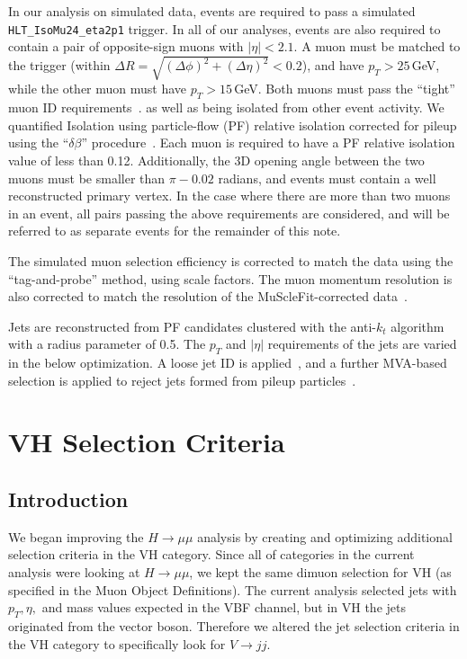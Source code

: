 \documentclass[12pt]{article}
\begin{document}
In our analysis on simulated data, events are required to pass a simulated \texttt{HLT\_IsoMu24\_eta2p1} trigger.
In all of our analyses, events are also required to contain a pair of opposite-sign muons with $|\eta|<2.1$.
A muon must be matched to the trigger (within $\Delta R = \sqrt{(\Delta \phi)^2+(\Delta \eta)^2}< 0.2$), 
and have $p_T>25$\,GeV, while the other muon must have $p_T>15$\,GeV.
Both muons must pass the ``tight'' muon ID requirements~\cite{AN2012_459}.
as well as being isolated from other event activity.  We quantified Isolation using
particle-flow (PF) relative isolation corrected for pileup using the ``$\delta \beta$''
procedure~\cite{AN2012_459}.  Each muon is required to have a PF relative isolation value
of less than 0.12.  Additionally, the 3D opening angle between the two muons must be
smaller than $\pi-0.02$ radians, and events must contain a well reconstructed primary
vertex.
In the case where there are more than two muons in an event, all pairs passing the above
requirements are considered, and will be referred to as separate events for the remainder
of this note.  

The simulated muon selection efficiency is corrected to match the data using 
the ``tag-and-probe'' method, using scale factors.  The muon momentum resolution
is also corrected to match the resolution of the MuScleFit-corrected data~\cite{AN2012_459}.

Jets are reconstructed from PF candidates clustered with the anti-$k_t$ algorithm with
a radius parameter of 0.5.  The $p_T$ and $|\eta|$ requirements of the jets are varied in
the below optimization.  A loose jet ID is applied~\cite{AN2012_459}, and a further
MVA-based selection is applied to reject jets formed from pileup particles~\cite{PUID}.

\section{VH Selection Criteria}

\subsection{Introduction}

We began improving the $H \rightarrow \mu \mu$ analysis by creating and optimizing additional selection criteria in the VH category. 
Since all of categories in the current analysis were looking at $H \rightarrow \mu \mu$, we kept the same dimuon 
selection for VH (as specified in the Muon Object Definitions). 
The current analysis selected jets with $p_{T}, \eta,$ and mass values expected in the VBF channel, but in VH the jets originated from the vector boson. 
Therefore we altered the jet selection criteria in the VH category to specifically look for $V \rightarrow jj$.
\end{document}
